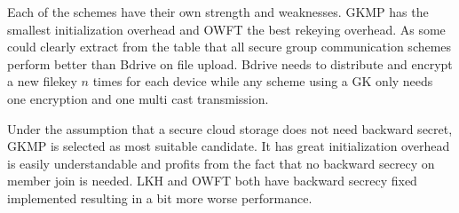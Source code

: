 Each of the schemes have their own strength and weaknesses. \ac{GKMP} has the smallest initialization overhead and \ac{OWFT} the best rekeying overhead. As some could clearly extract from the table that all secure group communication schemes perform better than Bdrive on file upload. Bdrive needs to distribute and encrypt a new filekey $n$ times for each device while any scheme using a \ac{GK} only needs one encryption and one multi cast transmission. 

Under the assumption that a secure cloud storage does not need backward secret, \ac{GKMP} is selected as most suitable candidate. It has great initialization overhead is easily understandable and profits from the fact that no backward secrecy on member join is needed. \ac{LKH} and \ac{OWFT} both have backward secrecy fixed implemented resulting in a bit more worse performance. 